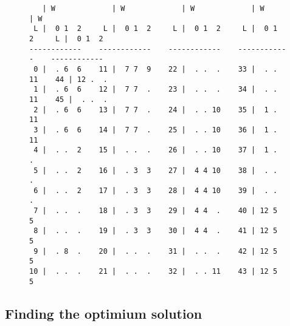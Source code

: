 \begin{figure}[H]
\centering
\begin{BVerbatim}
   | W             | W             | W             | W             | W          
 L |  0 1  2     L |  0 1  2     L |  0 1  2     L |  0 1  2     L |  0 1  2    
------------    ------------    ------------    ------------    ------------    
 0 |  . 6  6    11 |  7 7  9    22 |  . .  .    33 |  . . 11    44 | 12 .  .
 1 |  . 6  6    12 |  7 7  .    23 |  . .  .    34 |  . . 11    45 |  . .  .
 2 |  . 6  6    13 |  7 7  .    24 |  . . 10    35 |  1 . 11
 3 |  . 6  6    14 |  7 7  .    25 |  . . 10    36 |  1 . 11
 4 |  . .  2    15 |  . .  .    26 |  . . 10    37 |  1 .  .
 5 |  . .  2    16 |  . 3  3    27 |  4 4 10    38 |  . .  .
 6 |  . .  2    17 |  . 3  3    28 |  4 4 10    39 |  . .  .
 7 |  . .  .    18 |  . 3  3    29 |  4 4  .    40 | 12 5  5
 8 |  . .  .    19 |  . 3  3    30 |  4 4  .    41 | 12 5  5
 9 |  . 8  .    20 |  . .  .    31 |  . .  .    42 | 12 5  5
10 |  . .  .    21 |  . .  .    32 |  . . 11    43 | 12 5  5
\end{BVerbatim}
\label{fig:valid-roll}
\end{figure}

\subsection{Finding the optimium solution}
\label{sec:linear-programming:optimum}



